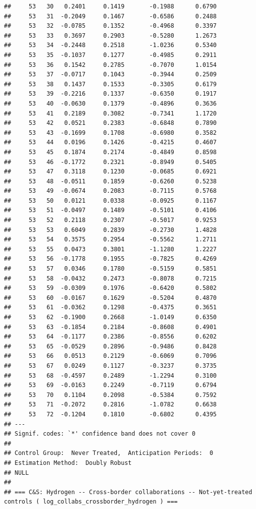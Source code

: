 \documentclass[
]{article}
\begin{document}
\begin{verbatim}
##     53   30   0.2401     0.1419       -0.1988      0.6790  
##     53   31  -0.2049     0.1467       -0.6586      0.2488  
##     53   32  -0.0785     0.1352       -0.4968      0.3397  
##     53   33   0.3697     0.2903       -0.5280      1.2673  
##     53   34  -0.2448     0.2518       -1.0236      0.5340  
##     53   35  -0.1037     0.1277       -0.4985      0.2911  
##     53   36   0.1542     0.2785       -0.7070      1.0154  
##     53   37  -0.0717     0.1043       -0.3944      0.2509  
##     53   38   0.1437     0.1533       -0.3305      0.6179  
##     53   39  -0.2216     0.1337       -0.6350      0.1917  
##     53   40  -0.0630     0.1379       -0.4896      0.3636  
##     53   41   0.2189     0.3082       -0.7341      1.1720  
##     53   42   0.0521     0.2383       -0.6848      0.7890  
##     53   43  -0.1699     0.1708       -0.6980      0.3582  
##     53   44   0.0196     0.1426       -0.4215      0.4607  
##     53   45   0.1874     0.2174       -0.4849      0.8598  
##     53   46  -0.1772     0.2321       -0.8949      0.5405  
##     53   47   0.3118     0.1230       -0.0685      0.6921  
##     53   48  -0.0511     0.1859       -0.6260      0.5238  
##     53   49  -0.0674     0.2083       -0.7115      0.5768  
##     53   50   0.0121     0.0338       -0.0925      0.1167  
##     53   51  -0.0497     0.1489       -0.5101      0.4106  
##     53   52   0.2118     0.2307       -0.5017      0.9253  
##     53   53   0.6049     0.2839       -0.2730      1.4828  
##     53   54   0.3575     0.2954       -0.5562      1.2711  
##     53   55   0.0473     0.3801       -1.1280      1.2227  
##     53   56  -0.1778     0.1955       -0.7825      0.4269  
##     53   57   0.0346     0.1780       -0.5159      0.5851  
##     53   58  -0.0432     0.2473       -0.8078      0.7215  
##     53   59  -0.0309     0.1976       -0.6420      0.5802  
##     53   60  -0.0167     0.1629       -0.5204      0.4870  
##     53   61  -0.0362     0.1298       -0.4375      0.3651  
##     53   62  -0.1900     0.2668       -1.0149      0.6350  
##     53   63  -0.1854     0.2184       -0.8608      0.4901  
##     53   64  -0.1177     0.2386       -0.8556      0.6202  
##     53   65  -0.0529     0.2896       -0.9486      0.8428  
##     53   66   0.0513     0.2129       -0.6069      0.7096  
##     53   67   0.0249     0.1127       -0.3237      0.3735  
##     53   68  -0.4597     0.2489       -1.2294      0.3100  
##     53   69  -0.0163     0.2249       -0.7119      0.6794  
##     53   70   0.1104     0.2098       -0.5384      0.7592  
##     53   71  -0.2072     0.2816       -1.0782      0.6638  
##     53   72  -0.1204     0.1810       -0.6802      0.4395  
## ---
## Signif. codes: `*' confidence band does not cover 0
## 
## Control Group:  Never Treated,  Anticipation Periods:  0
## Estimation Method:  Doubly Robust
## NULL
## 
## === C&S: Hydrogen -- Cross-border collaborations -- Not-yet-treated controls ( log_collabs_crossborder_hydrogen ) ===
\end{verbatim}
\end{document}
